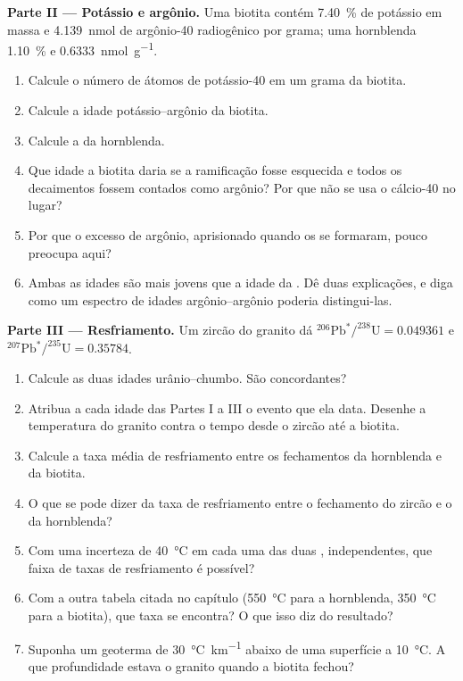 \begin{problem}
\noindent\textbf{Parte II --- Potássio e argônio.} Uma biotita contém
\qty{7.40}{\percent} de potássio em massa e \qty{4.139}{nmol} de argônio-40 radiogênico por
grama; uma hornblenda \qty{1.10}{\percent} e \qty{0.6333}{nmol.g^{-1}}.
\begin{enumerate}[resume]
  \item Calcule o número de átomos de potássio-40 em um grama da biotita.
  \item Calcule a idade potássio--argônio da biotita.
  \item Calcule a da hornblenda.
  \item Que idade a biotita daria se a ramificação fosse esquecida e todos os decaimentos fossem
        contados como argônio? Por que não se usa o cálcio-40 no lugar?
  \item Por que o excesso de argônio, aprisionado quando os  se formaram, pouco preocupa
        aqui?
  \item Ambas as idades são mais jovens que a idade da . Dê duas explicações, e diga
        como um espectro de idades argônio--argônio poderia distingui-las.
\end{enumerate}

\noindent\textbf{Parte III --- Resfriamento.} Um zircão do granito dá
$^{206}\mathrm{Pb}^*/^{238}\mathrm{U} = 0.049361$ e
$^{207}\mathrm{Pb}^*/^{235}\mathrm{U} = 0.35784$.
\begin{enumerate}[resume]
  \item Calcule as duas idades urânio--chumbo. São concordantes?
  \item Atribua a cada idade das Partes I a III o evento que ela data. Desenhe a temperatura do
        granito contra o tempo desde o zircão até a biotita.
  \item Calcule a taxa média de resfriamento entre os fechamentos da hornblenda e da biotita.
  \item O que se pode dizer da taxa de resfriamento entre o fechamento do zircão e o da
        hornblenda?
  \item Com uma incerteza de \qty{40}{\celsius} em cada uma das duas ,
        independentes, que faixa de taxas de resfriamento é possível?
  \item Com a outra tabela citada no capítulo (\qty{550}{\celsius} para a hornblenda,
        \qty{350}{\celsius} para a biotita), que taxa se encontra? O que isso diz do resultado?
  \item Suponha um geoterma de \qty{30}{\celsius.km^{-1}} abaixo de uma superfície a
        \qty{10}{\celsius}. A que profundidade estava o granito quando a biotita fechou?
\end{enumerate}


\end{problem}
